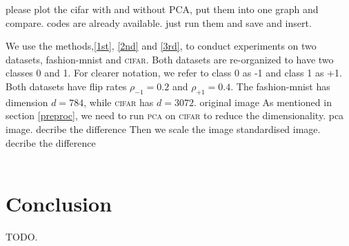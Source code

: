 \documentclass[12pt]{article} %
\newcommand{\rhoo}{\rho_{+1}}
\newcommand{\rhoz}{\rho_{-1}}
\begin{document}
{\color{red} please plot the cifar with and without PCA, put them into one graph and compare. codes are already available. just run them and save and insert.}

We use the methods,\ref{1st}, \ref{2nd} and \ref{3rd}, to conduct experiments on two datasets, fashion-mnist and \textsc{cifar}.
Both datasets are re-organized to have two classes 0 and 1.
For clearer notation, we refer to class 0 as -1 and class 1 as +1.
Both datasets have flip rates $\rhoz=0.2$ and $\rhoo=0.4$.
The fashion-mnist has dimension $d=784$, while \textsc{cifar} has $d=3072$.
{\color{red} original image}
As mentioned in section \ref{preproc}, we need to run \textsc{pca} on \textsc{cifar} to reduce the dimensionality.
{\color{red} pca image. decribe the difference}
Then we scale the image
{\color{red} standardised image. decribe the difference} \\ \\


\section{Conclusion}
{\color{red} TODO.}\\

\label{headings}





\end{document}
